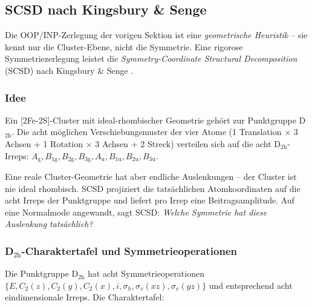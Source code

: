 \documentclass[11pt,a4paper,twoside]{article}
\newcommand{\Ag}{A_{\mathrm{g}}}
\newcommand{\Bgi}[1]{B_{\mathrm{#1g}}}
\newcommand{\Bui}[1]{B_{\mathrm{#1u}}}
\newcommand{\Aui}{A_{\mathrm{u}}}
\theoremstyle{remark}
\begin{document}
\subsection{SCSD nach Kingsbury \& Senge}
\label{sec:scsd}

Die OOP/INP-Zerlegung der vorigen Sektion ist eine
\emph{geometrische Heuristik} -- sie kennt nur die Cluster-Ebene, nicht
die Symmetrie. Eine rigorose Symmetriezerlegung leistet die
\emph{Symmetry-Coordinate Structural Decomposition} (SCSD) nach
Kingsbury \& Senge \cite{Kingsbury2024}.

\subsubsection*{Idee}

Ein {[}2Fe-2S{]}-Cluster mit ideal-rhombischer Geometrie geh\"ort zur
Punktgruppe D$_\mathrm{2h}$. Die acht m\"oglichen Verschiebungsmuster
der vier Atome (1 Translation $\times$ 3 Achsen + 1 Rotation $\times$
3 Achsen + 2 Streck) verteilen sich auf die acht D$_\mathrm{2h}$-Irreps:
$\Ag, \Bgi{1}, \Bgi{2}, \Bgi{3}, \Aui, \Bui{1}, \Bui{2}, \Bui{3}$.

Eine reale Cluster-Geometrie hat aber endliche Auslenkungen -- der
Cluster ist nie ideal rhombisch. SCSD projiziert die tats\"achlichen
Atomkoordinaten auf die acht Irreps der Punktgruppe und liefert pro
Irrep eine Beitragsamplitude. Auf eine Normalmode angewandt, sagt
SCSD: \emph{Welche Symmetrie hat diese Auslenkung tats\"achlich?}

\subsubsection*{D$_\mathrm{2h}$-Charaktertafel und Symmetrieoperationen}

Die Punktgruppe D$_\mathrm{2h}$ hat acht Symmetrieoperationen
$\{E, C_2(z), C_2(y), C_2(x), i, \sigma_h, \sigma_v(xz), \sigma_v(yz)\}$
und entsprechend acht eindimensionale Irreps. Die Charaktertafel:
\end{document}
